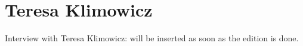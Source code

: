 \section{Teresa Klimowicz}

Interview with Teresa Klimowicz: will be inserted as soon as the edition is done.